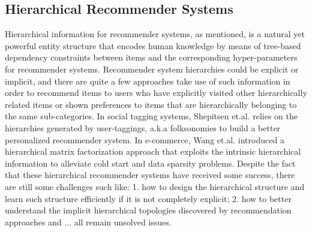 \subsection{Hierarchical Recommender Systems}
Hierarchical information for recommender systems, as mentioned, is a natural yet powerful entity structure that encodes human knowledge by means of tree-based dependency constraints between items and the corresponding hyper-parameters for recommender systems.  Recommender system hierarchies could be explicit or implicit, and there are quite a few approaches take use of such information in order to recommend items to users who have explicitly visited other hierarchically related items or shown preferences to items that are hierarchically belonging to the same sub-categories.  In social tagging systems, Shepitsen et.al. \cite{shepitsen2008personalized} relies on the hierarchies generated by user-taggings, a.k.a folksonomies to build a better personalized recommender system.  In e-commerce, Wang et.al. \cite{wang2018exploring} introduced a hierarchical matrix factorization approach that exploits the intrinsic hierarchical information to alleviate cold start and data sparsity problems.  Despite the fact that these hierarchical recommender systems have received some success, there are still some challenges such like: 1. how to design the hierarchical structure and learn such structure efficiently if it is not completely explicit; 2. how to better understand the implicit hierarchical topologies discovered by recommendation approaches and ... all remain unsolved issues.

